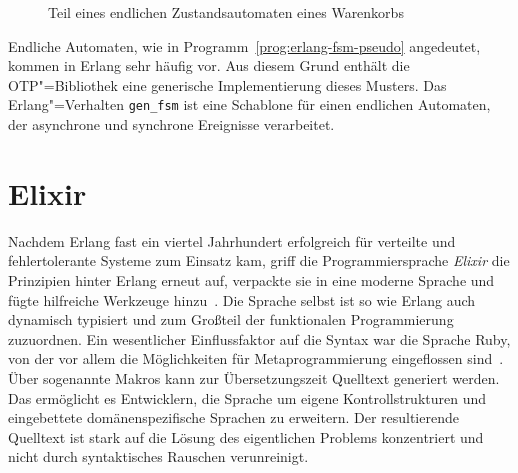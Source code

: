 \begin{figure}[!hbt]%
\caption{Teil eines endlichen Zustandsautomaten eines Warenkorbs}%
\label{fig:fsm-diag}%
\end{figure}

Endliche Automaten, wie in Programm~\ref{prog:erlang-fsm-pseudo} angedeutet, kommen in Erlang sehr häufig vor. Aus diesem Grund enthält die OTP"=Bibliothek eine generische Implementierung dieses Musters. Das Erlang"=Verhalten \lstinline{gen_fsm} ist eine Schablone für einen endlichen Automaten, der asynchrone und synchrone Ereignisse verarbeitet.

\section{Elixir}

Nachdem Erlang fast ein viertel Jahrhundert erfolgreich für verteilte und fehlertolerante Systeme zum Einsatz kam, griff die Programmiersprache \mbox{\textit{Elixir}} die Prinzipien hinter Erlang erneut auf, verpackte sie in eine moderne Sprache und fügte hilfreiche Werkzeuge hinzu~\cite[9-10]{Loder2016}. Die Sprache selbst ist so wie Erlang auch dynamisch typisiert und zum Großteil der funktionalen Programmierung zuzuordnen. Ein wesentlicher Einflussfaktor auf die Syntax war die Sprache Ruby, von der vor allem die Möglichkeiten für Metaprogrammierung eingeflossen sind~\cite{ValimGoto2014}. Über sogenannte Makros kann zur Übersetzungszeit Quelltext generiert werden. Das ermöglicht es Entwicklern, die Sprache um eigene Kontrollstrukturen und eingebettete domänenspezifische Sprachen zu erweitern. Der resultierende Quelltext ist stark auf die Lösung des eigentlichen Problems konzentriert und nicht durch syntaktisches Rauschen verunreinigt.

